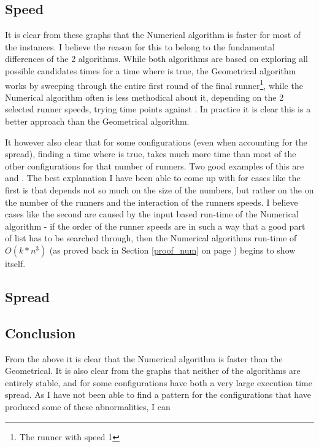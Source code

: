 \subsection{Speed}


It is clear from these graphs that the Numerical algorithm is faster for most of the instances. 
I believe the reason for this to belong to the fundamental differences of the 2 algorithms. While both algorithms are based on exploring all possible candidates times for a time where  is true, the Geometrical algorithm works by sweeping through the entire first round of the final runner\footnote{The runner with speed 1}, while the Numerical algorithm often is less methodical about it, depending on the 2 selected runner speeds, trying time points against . In practice it is clear this is a better approach than the Geometrical algorithm.
 
It however also clear that for some configurations (even when accounting for the spread), finding a time where  is true, takes much more time than most of the other configurations for that number of runners. Two good examples of this are  and . The best explanation I have been able to come up with for cases like the first is that  depends not so much on the size of the numbers, but rather on the on the number of the runners and the interaction of the runners speeds. I believe cases like the second are caused by the input based run-time of the Numerical algorithm - if the order of the runner speeds are in such a way that a good part of list has to be searched through, then the Numerical algorithms run-time of $O(k * n^3)$ (as proved back in Section \ref{proof_num} on page \pageref{proof_num}) begins to show itself.  

\subsection{Spread}




\subsection{Conclusion}

From the above it is clear that the Numerical algorithm is faster than the Geometrical. It is also clear from the graphs that neither of the algorithms are entirely stable, and for some configurations have both a very large execution time spread. As I have not been able to find a pattern for the configurations that have produced some of these abnormalities, I can 
